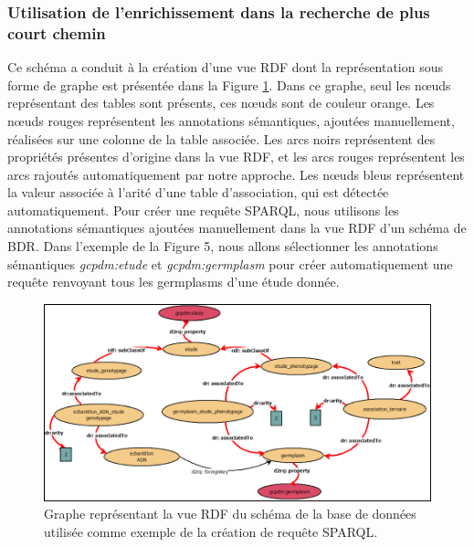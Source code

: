\subsubsection*{Utilisation de l'enrichissement dans la recherche de plus court chemin}
Ce schéma a conduit à la création d'une vue RDF dont la représentation sous forme de graphe est présentée dans la Figure \ref{graph}. Dans ce graphe, seul les nœuds représentant des tables sont présents, ces nœuds sont de couleur orange. Les nœuds rouges représentent les annotations sémantiques, ajoutées manuellement, réalisées sur une colonne de la table associée. Les arcs noirs représentent des propriétés présentes d’origine dans la vue RDF, et les arcs rouges représentent les arcs rajoutés automatiquement par notre approche. Les nœuds bleus représentent la valeur associée à l’arité d’une table d’association, qui est détectée automatiquement. Pour créer une requête SPARQL, nous utilisons les annotations sémantiques ajoutées manuellement dans la vue RDF d'un schéma de BDR. Dans l’exemple de la Figure 5, nous allons sélectionner les annotations sémantiques \textit{gcpdm:etude} et \textit{gcpdm:germplasm} pour créer automatiquement une requête renvoyant tous les germplasms d'une étude donnée. 

\begin{figure}[!ht]
\begin{center}
	\includegraphics[width=1\textwidth]{Figures/biosemantic3.png}
\end{center}
\caption{\label{graph} Graphe représentant la vue RDF du schéma de la base de données utilisée comme exemple de la création de requête SPARQL.}
\end{figure}

